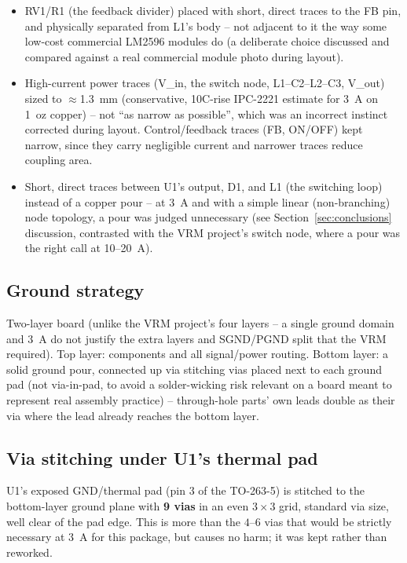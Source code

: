 \documentclass[11pt,letterpaper]{article}
\begin{document}
\begin{itemize}[nosep]
    \item RV1/R1 (the feedback divider) placed with short, direct traces to the FB pin, and physically
    separated from L1's body -- not adjacent to it the way some low-cost commercial LM2596 modules do
    (a deliberate choice discussed and compared against a real commercial module photo during layout).
    \item High-current power traces (V\_in, the switch node, L1--C2--L2--C3, V\_out) sized to
    $\approx$\SI{1.3}{\milli\meter} (conservative, 10\textdegree C-rise IPC-2221 estimate for
    \SI{3}{\ampere} on \SI{1}{oz} copper) -- not ``as narrow as possible'', which was an incorrect
    instinct corrected during layout. Control/feedback traces (FB, ON/OFF) kept narrow, since they carry
    negligible current and narrower traces reduce coupling area.
    \item Short, direct traces between U1's output, D1, and L1 (the switching loop) instead of a copper
    pour -- at \SI{3}{\ampere} and with a simple linear (non-branching) node topology, a pour was judged
    unnecessary (see Section~\ref{sec:conclusions} discussion, contrasted with the VRM project's switch
    node, where a pour was the right call at \SI{10}{}--\SI{20}{\ampere}).
\end{itemize}

\subsection{Ground strategy}

Two-layer board (unlike the VRM project's four layers -- a single ground domain and \SI{3}{\ampere} do
not justify the extra layers and SGND/PGND split that the VRM required). Top layer: components and all
signal/power routing. Bottom layer: a solid ground pour, connected up via stitching vias placed next to
each ground pad (not via-in-pad, to avoid a solder-wicking risk relevant on a board meant to represent
real assembly practice) -- through-hole parts' own leads double as their via where the lead already
reaches the bottom layer.

\subsection{Via stitching under U1's thermal pad}

U1's exposed GND/thermal pad (pin 3 of the TO-263-5) is stitched to the bottom-layer ground plane with
\textbf{9 vias} in an even $3\times3$ grid, standard via size, well clear of the pad edge. This is more
than the $4$--$6$ vias that would be strictly necessary at \SI{3}{\ampere} for this package, but causes no
harm; it was kept rather than reworked.
\end{document}
